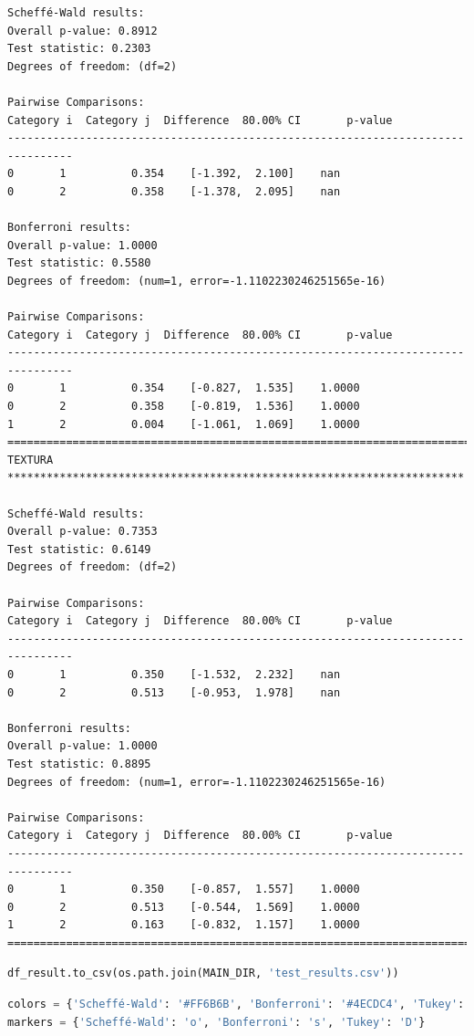 \begin{lstlisting}
Scheffé-Wald results:
Overall p-value: 0.8912
Test statistic: 0.2303
Degrees of freedom: (df=2)

Pairwise Comparisons:
Category i  Category j  Difference  80.00% CI       p-value
--------------------------------------------------------------------------------
0       1          0.354    [-1.392,  2.100]    nan
0       2          0.358    [-1.378,  2.095]    nan

Bonferroni results:
Overall p-value: 1.0000
Test statistic: 0.5580
Degrees of freedom: (num=1, error=-1.1102230246251565e-16)

Pairwise Comparisons:
Category i  Category j  Difference  80.00% CI       p-value
--------------------------------------------------------------------------------
0       1          0.354    [-0.827,  1.535]    1.0000
0       2          0.358    [-0.819,  1.536]    1.0000
1       2          0.004    [-1.061,  1.069]    1.0000
================================================================================
TEXTURA **********************************************************************

Scheffé-Wald results:
Overall p-value: 0.7353
Test statistic: 0.6149
Degrees of freedom: (df=2)

Pairwise Comparisons:
Category i  Category j  Difference  80.00% CI       p-value
--------------------------------------------------------------------------------
0       1          0.350    [-1.532,  2.232]    nan
0       2          0.513    [-0.953,  1.978]    nan

Bonferroni results:
Overall p-value: 1.0000
Test statistic: 0.8895
Degrees of freedom: (num=1, error=-1.1102230246251565e-16)

Pairwise Comparisons:
Category i  Category j  Difference  80.00% CI       p-value
--------------------------------------------------------------------------------
0       1          0.350    [-0.857,  1.557]    1.0000
0       2          0.513    [-0.544,  1.569]    1.0000
1       2          0.163    [-0.832,  1.157]    1.0000
================================================================================
\end{lstlisting}

\begin{lstlisting}[language=Python]
df_result.to_csv(os.path.join(MAIN_DIR, 'test_results.csv'))
\end{lstlisting}

\begin{lstlisting}[language=Python]
colors = {'Scheffé-Wald': '#FF6B6B', 'Bonferroni': '#4ECDC4', 'Tukey': '#45B7D1'}
markers = {'Scheffé-Wald': 'o', 'Bonferroni': 's', 'Tukey': 'D'}
\end{lstlisting}

